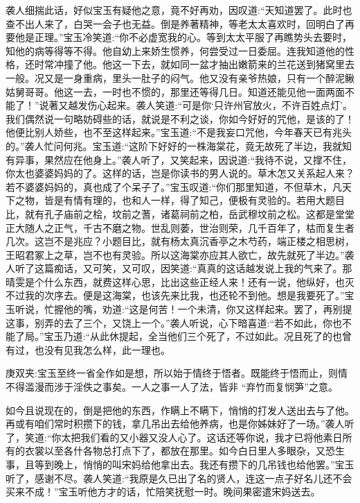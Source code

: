 \begin{parag}
    袭人细揣此话，好似宝玉有疑他之意，竟不好再劝，因叹道:“天知道罢了。此时也查不出人来了，白哭一会子也无益。倒是养著精神，等老太太喜欢时，回明白了再要他是正理。”宝玉冷笑道:“你不必虚宽我的心。等到太太平服了再瞧势头去要时，知他的病等得等不得。他自幼上来娇生惯养，何尝受过一日委屈。连我知道他的性格，还时常冲撞了他。他这一下去，就如同一盆才抽出嫩箭来的兰花送到猪窝里去一般。况又是一身重病，里头一肚子的闷气。他又没有亲爷热娘，只有一个醉泥鳅姑舅哥哥。他这一去，一时也不惯的，那里还等得几日。知道还能见他一面两面不能了！”说著又越发伤心起来。袭人笑道:“可是你‘只许州官放火，不许百姓点灯’。我们偶然说一句略妨碍些的话，就说是不利之谈，你如今好好的咒他，是该的了！他便比别人娇些，也不至这样起来。”宝玉道:“不是我妄口咒他，今年春天已有兆头的。”袭人忙问何兆。宝玉道:“这阶下好好的一株海棠花，竟无故死了半边，我就知有异事，果然应在他身上。”袭人听了，又笑起来，因说道:“我待不说，又撑不住，你太也婆婆妈妈的了。这样的话，岂是你读书的男人说的。草木怎又关系起人来？若不婆婆妈妈的，真也成了个呆子了。”宝玉叹道:“你们那里知道，不但草木，凡天下之物，皆是有情有理的，也和人一样，得了知己，便极有灵验的。若用大题目比，就有孔子庙前之桧，坟前之蓍，诸葛祠前之柏，岳武穆坟前之松。这都是堂堂正大随人之正气，千古不磨之物。世乱则萎，世治则荣，几千百年了，枯而复生者几次。这岂不是兆应？小题目比，就有杨太真沉香亭之木芍药，端正楼之相思树，王昭君冢上之草，岂不也有灵验。所以这海棠亦应其人欲亡，故先就死了半边。”袭人听了这篇痴话，又可笑，又可叹，因笑道:“真真的这话越发说上我的气来了。那晴雯是个什么东西，就费这样心思，比出这些正经人来！还有一说，他纵好，也灭不过我的次序去。便是这海棠，也该先来比我，也还轮不到他。想是我要死了。”宝玉听说，忙握他的嘴，劝道:“这是何苦！一个未清，你又这样起来。罢了，再别提这事，别弄的去了三个，又饶上一个。”袭人听说，心下暗喜道:“若不如此，你也不能了局。”宝玉乃道:“从此休提起，全当他们三个死了，不过如此。况且死了的也曾有过，也没有见我怎么样，此一理也。\begin{note}庚双夹:宝玉至终一省全作如是想，所以始于情终于悟者。既能终于悟而止，则情不得滥漫而涉于淫佚之事矣。一人之事一人了法，皆非 “弃竹而复悯笋”之意。\end{note}如今且说现在的，倒是把他的东西，作瞒上不瞒下，悄悄的打发人送出去与了他。再或有咱们常时积攒下的钱，拿几吊出去给他养病，也是你姊妹好了一场。”袭人听了，笑道:“你太把我们看的又小器又没人心了。这话还等你说，我才已将他素日所有的衣裳以至各什各物总打点下了，都放在那里。如今白日里人多眼杂，又恐生事，且等到晚上，悄悄的叫宋妈给他拿出去。我还有攒下的几吊钱也给他罢。”宝玉听了，感谢不尽。袭人笑道:“我原是久已出了名的贤人，连这一点子好名儿还不会买来不成！”宝玉听他方才的话，忙陪笑抚慰一时。晚间果密遣宋妈送去。
\end{parag}


